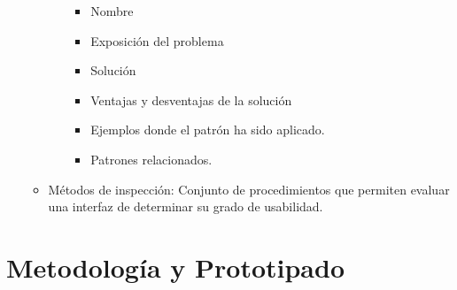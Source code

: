 \documentclass[12pt, twoside, openright]{report} %
\begin{document}
\begin{itemize}
\begin{itemize}
\begin{itemize}
        \begin{itemize}
        
        \item
          Nombre
        \item
          Exposición del problema
        \item
          Solución
        \item
          Ventajas y desventajas de la solución
        \item
          Ejemplos donde el patrón ha sido aplicado.
        \item
          Patrones relacionados.
        \end{itemize}
      \end{itemize}
    \item
      Métodos de inspección: Conjunto de procedimientos que permiten
      evaluar una interfaz de determinar su grado de usabilidad.
    \end{itemize}
  \end{itemize}
\pagebreak
\section{Metodología y Prototipado}
\end{document}
